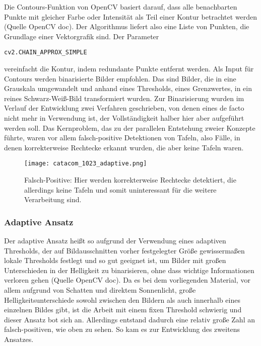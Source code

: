 Die Contours-Funktion von OpenCV basiert darauf, dass alle benachbarten Punkte mit gleicher Farbe oder Intensität als Teil einer Kontur betrachtet werden (Quelle OpenCV doc). Der Algorithmus liefert also eine Liste von Punkten, die Grundlage einer Vektorgrafik sind. Der Parameter
\begin{verbatim}
cv2.CHAIN_APPROX_SIMPLE
\end{verbatim}
vereinfacht die Kontur, indem redundante Punkte entfernt werden. Als Input für Contours werden binarisierte Bilder empfohlen. Das sind Bilder, die in eine Grauskala umgewandelt  und anhand eines Thresholds, eines Grenzwertes, in ein reines Schwarz-Weiß-Bild transformiert wurden. Zur Binarisierung wurden im Verlauf der Entwicklung zwei Verfahren geschrieben, von denen eines de facto nicht mehr in Verwendung ist, der Vollständigkeit halber hier aber aufgeführt werden soll.
Das Kernproblem, das zu der parallelen Entstehung zweier Konzepte führte, waren vor allem falsch-positive Detektionen von Tafeln, also Fälle, in denen korrekterweise Rechtecke erkannt wurden, die aber keine Tafeln waren.
\begin{SCfigure}[0.5][h!]
\caption{Falsch-Positive: Hier werden korrekterweise Rechtecke detektiert, die allerdings keine Tafeln und somit uninteressant für die weitere Verarbeitung sind.}
\texttt{[image: catacom\_1023\_adaptive.png]}
\end{SCfigure}

\subsubsection*{ Adaptive Ansatz}
Der adaptive Ansatz heißt so aufgrund der Verwendung eines adaptiven Thresholds, der auf Bildausschnitten vorher festgelegter Größe gewissermaßen lokale Thresholds festlegt und so gut geeignet ist, um Bilder mit großen Unterschieden in der Helligkeit zu binarisieren, ohne dass wichtige Informationen verloren gehen (Quelle OpenCV doc). Da es bei dem vorliegenden Material, vor allem aufgrund von Schatten und direktem Sonnenlicht, große Helligkeitsunterschiede sowohl zwischen den Bildern als auch innerhalb eines einzelnen Bildes gibt, ist die Arbeit mit einem fixen Threshold schwierig und dieser Ansatz bot sich an. Allerdings entstand dadurch eine relativ große Zahl an falsch-positiven, wie oben zu sehen. So kam es zur Entwicklung des zweitens Ansatzes.\\


